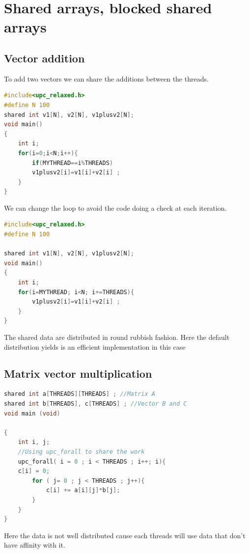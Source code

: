 \documentclass{report}
\begin{document}
\chapter{Shared arrays, blocked shared arrays}



\section{Vector addition}

To add two vectors we can share the additions between the threads.

\begin{lstlisting}[language=C]
#include<upc_relaxed.h> 
#define N 100 
shared int v1[N], v2[N], v1plusv2[N]; 
void main() 
{ 
    int i; 
    for(i=0;i<N;i++){
        if(MYTHREAD==i%THREADS) 
        v1plusv2[i]=v1[i]+v2[i] ; 
    }
}
\end{lstlisting}

    We can change the loop to avoid the code doing a check at each iteration.

\begin{lstlisting}[language=C]
#include<upc_relaxed.h> 
#define N 100 

shared int v1[N], v2[N], v1plusv2[N]; 
void main() 
{ 
    int i; 
    for(i=MYTHREAD; i<N; i+=THREADS){
        v1plusv2[i]=v1[i]+v2[i] ; 
    }
}
\end{lstlisting}

The shared data are distributed in round rubbish fashion. Here the default distribution yields is an efficient implementation in this case

\section{Matrix vector multiplication}

\begin{lstlisting}[language=C]
shared int a[THREADS][THREADS] ; //Matrix A
shared int b[THREADS], c[THREADS] ; //Vector B and C
void main (void) 

{
    int i, j; 
    //Using upc_forall to share the work
    upc_forall( i = 0 ; i < THREADS ; i++; i){
    c[i] = 0;
        for ( j= 0 ; j < THREADS ; j++){
            c[i] += a[i][j]*b[j];
        }
    }
}
\end{lstlisting}

Here the data is not well distributed cause each threads will use data that don't have affinity with it.
\end{document}
